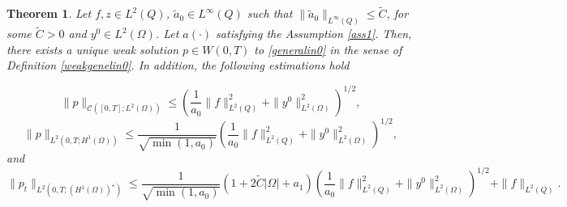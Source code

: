 \documentclass[reqno,twoside]{amsart}
\numberwithin{equation}{section}
\newtheorem{theorem}{Theorem}[section]
\theoremstyle{definition}
\numberwithin{equation}{section}
\def \dis {\displaystyle}
\def \C {\mathcal{C}}
\def \C {{\mathcal C}}
\def \C {\mathcal{C}}
\def \C {{\mathcal C}}
\begin{document}
\begin{theorem}\label{theoremexistencelin0}
Let $f, z\in L^2(Q)$, $\tilde{a}_0\in L^\infty(Q)$ such that $\|\tilde{a}_0\|_{L^\infty(Q)}\leq \tilde{C}$, for some $\tilde{C}>0$ and $y^{0}\in L^2(\Omega)$. Let $a(\cdot)$ satisfying the Assumption \ref{ass1}. Then, there exists a unique weak solution $p \in W(0,T)$ to \eqref{generalin0} in the sense of Definition \ref{weakgenelin0}.
In addition, the following estimations hold


\begin{equation}\label{estimationgenlin0}
	\|p\|_{\C([0,T];L^2(\Omega))} \leq \left(\frac{1}{a_0}\|f\|^2_{L^2(Q)}+\|y^0\|^2_{L^2(\Omega)}\right)^{1/2},
\end{equation}
\begin{equation}\label{estimationgenlin1}
	\|p\|_{L^2(0,T;H^1(\Omega))} \leq \frac{1}{\sqrt{\min(1,a_0)}}\left(\frac{1}{a_0}\|f\|^2_{L^2(Q)}+\|y^0\|^2_{L^2(\Omega)}\right)^{1/2},
\end{equation}
and
\begin{equation} \label{estimationint3}
	\dis \|p_t\|_{L^2(0,T;(H^1(\Omega))^\star)}\leq \frac{1}{\sqrt{\min(1,a_0)}} \left(1+2\tilde{C}|\Omega|+a_1\right)\left(\frac{1}{a_0}\|f\|^2_{L^2(Q)}+\|y^0\|^2_{L^2(\Omega)}\right)^{1/2}+\|f\|_{L^2(Q)}.
\end{equation}
\end{theorem}
\end{document}
